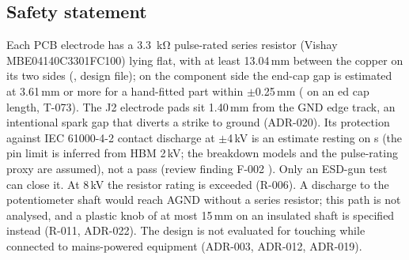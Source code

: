 \subsection{Safety statement}
Each PCB electrode has a \qty{3.3}{\kilo\ohm} pulse-rated series resistor (Vishay
MBE04140C3301FC100) lying flat, with at least 13.04\,mm between the copper on its two
sides (, design file); on the component side the end-cap gap is
estimated at 3.61\,mm or more for a hand-fitted part within $\pm$0.25\,mm
( on an ed cap length, T-073). The J2 electrode
pads sit 1.40\,mm from the GND edge track, an intentional spark gap that diverts a
strike to ground (ADR-020). Its protection against IEC 61000-4-2
contact discharge at $\pm$4\,kV is an estimate resting on s (the pin
limit is inferred from HBM 2\,kV; the breakdown models and the pulse-rating proxy
are assumed), not a pass (review finding F-002
). Only an ESD-gun test can close it. At
8\,kV the resistor rating is exceeded (R-006). A discharge to the potentiometer
shaft would reach AGND without a series resistor; this path is not analysed, and a
plastic knob of at most 15\,mm on an insulated shaft is specified instead (R-011,
ADR-022). The design is not evaluated for
touching while connected to mains-powered equipment (ADR-003, ADR-012, ADR-019).

